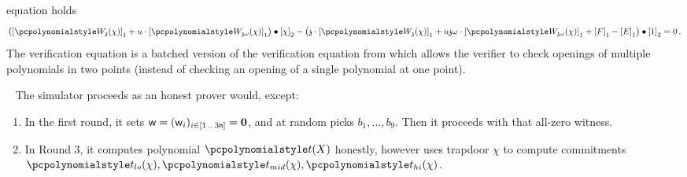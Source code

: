 \begin{description}
  equation holds
	\begin{multline}
		\label{eq:ver_eq}
		\left( \gone{\p{W_{\chz}}(\chi)} + u \cdot \gone{\p{W_{\chz
                \omega}}(\chi)} \right) \bullet
		\gtwo{\chi} - %
		\left( \chz \cdot \gone{\p{W_{\chz}}(\chi)} + u \chz \omega \cdot
          \gone{\p{W_{\chz \omega}}(\chi)} + \gone{F} - \gone{E} \right) \bullet
        \gtwo{1} = 0\,.
	\end{multline}
  The verification equation is a batched version of the verification equation
  from \cite{AC:KatZavGol10} which allows the verifier to check openings of
  multiple polynomials in two points (instead of checking an opening of a single
  polynomial at one point).
\end{description}

\ \newline
The \plonk{} simulator proceeds as an honest prover would, except:
\begin{enumerate}
  \item In the first round, it sets $\wit = (\wit_i)_{i \in \range{1}{3 \noofc}}
    = \vec{0}$, and at random picks $b_1, \ldots, b_9$. Then it proceeds with
    that all-zero witness.
  \item In Round 3, it computes polynomial $\pt(X)$ honestly, however uses
    trapdoor $\chi$ to compute commitments
    $\p{t_{lo}}(\chi), \p{t_{mid}}(\chi), \p{t_{hi}}(\chi)$.
  \end{enumerate}
 

